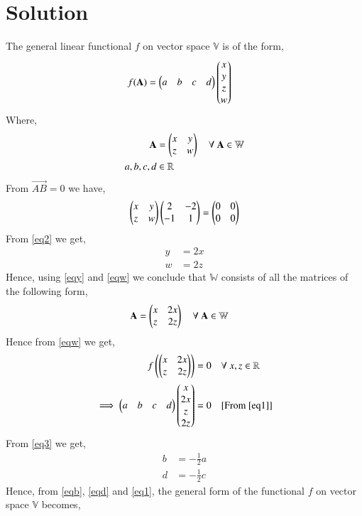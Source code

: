 \documentclass[journal,12pt,twocolumn]{IEEEtran}
\begin{document}
\section{\textbf{Solution}}
The general linear functional $f$ on vector space $\mathbb{V}$ is of the form,
\begin{align}
f(\mathbf{A}) &= \begin{pmatrix}a&b&c&d\end{pmatrix}\begin{pmatrix}x\\y\\z\\w\end{pmatrix}\label{eq1}
\end{align}
Where,
\begin{align}
\mathbf{A} &= \begin{pmatrix}x&y\\z&w\end{pmatrix} \quad{\text{$\forall$ $\mathbf{A} \in \mathbb{W}$}}\\
a,b,c,d &\in \mathbb{R}
\end{align}
From $\vec{AB} = 0$ we have,
\begin{align}
\begin{pmatrix}x&y\\z&w\end{pmatrix}\begin{pmatrix}2&-2\\-1&1\end{pmatrix} = \begin{pmatrix}0&0\\0&0\end{pmatrix}\label{eq2}
\end{align}
From \eqref{eq2} we get,
\begin{align}
y &= 2x\label{eqy}\\
w &= 2z\label{eqw}
\end{align}
Hence, using \eqref{eqy} and \eqref{eqw} we conclude that $\mathbb{W}$ consists of all the matrices of the following form,
\begin{align}
\mathbf{A} &= \begin{pmatrix}x&2x\\z&2z\end{pmatrix} \quad{\text{$\forall$ $\mathbf{A} \in \mathbb{W}$}}\label{eqw}
\end{align}
Hence from \eqref{eqw} we get,
\begin{align}
f\left(\begin{pmatrix}x&2x\\z&2z\end{pmatrix}\right) &= 0 \quad{\text{$\forall$ $x,z \in \mathbb{R}$}}\\
\implies \begin{pmatrix}a&b&c&d\end{pmatrix}\begin{pmatrix}x\\2x\\z\\2z\end{pmatrix} &= 0\quad{\text{[From \eqref{eq1}]}}\label{eq3}
\end{align}
From \eqref{eq3} we get,
\begin{align}
b &= -\frac{1}{2}a\label{eqb}\\
d &= -\frac{1}{2}c\label{eqd}
\end{align}
Hence, from \eqref{eqb}, \eqref{eqd} and \eqref{eq1}, the general form of the functional $f$ on vector space $\mathbb{V}$ becomes,
\end{document}
